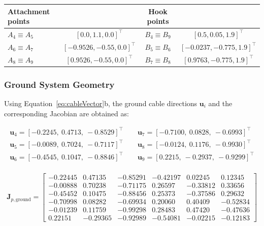 \begin{table}[h]
    \centering
    \begin{tabular}{lccc}
        Attachment points       &    & Hook points & \\ \hline
        $A_4 \equiv A_5$ &  $[0.0, 1.1, 0.0]^\top$         &   $B_4 \equiv B_9$ &  $[0.5, 0.05, 1.9]^\top$          \\
        $A_6 \equiv A_7$ &  $[-0.9526, -0.55, 0.0]^\top$   &   $B_5 \equiv B_6$ &  $[-0.0237, -0.775, 1.9]^\top$    \\
        $A_8 \equiv A_9$ &  $[0.9526, -0.55, 0.0]^\top$    &   $B_7 \equiv B_8$ &  $[0.9763, -0.775, 1.9]^\top$     \\
    \end{tabular}
\end{table}

\subsubsection{Ground System Geometry}
Using Equation~\eqref{eq:cableVector}b, the ground cable directions $\mathbf u_i$ and the corresponding Jacobian are obtained as:

\begin{equation}
    \begin{aligned}
    \mathbf u_4 = [-0.2245,\ 0.4713,\ -0.8529]^\top \qquad \mathbf u_7 = [-0.7100,\ 0.0828,\ -0.6993]^\top \\
    \mathbf u_5 = [-0.0089,\ 0.7024,\ -0.7117]^\top \qquad \mathbf u_8 = [-0.0124,\ 0.1176,\ -0.9930]^\top \\
    \mathbf u_6 = [-0.4545,\ 0.1047,\ -0.8846]^\top \qquad \mathbf u_9 = [0.2215,\ -0.2937,\ -0.9299]^\top \\
    \end{aligned}
\end{equation}

\begin{equation}
\mathbf J_{p,\text{ground}} =
\begin{bmatrix}
-0.22445 & 0.47135 & -0.85291 & -0.42197 & 0.02245 & 0.12345 \\
-0.00888 & 0.70238 & -0.71175 & 0.26597 & -0.33812 & 0.33656 \\
-0.45452 & 0.10475 & -0.88456 & 0.25373 & -0.37586 & 0.29632 \\
-0.70998 & 0.08282 & -0.69934 & 0.20060 & 0.40409 & -0.52834 \\
-0.01239 & 0.11759 & -0.99298 & 0.28483 & 0.47420 & -0.47636 \\
0.22151 & -0.29365 & -0.92989 & -0.54081 & -0.02215 & -0.12183
\end{bmatrix}
\end{equation}

